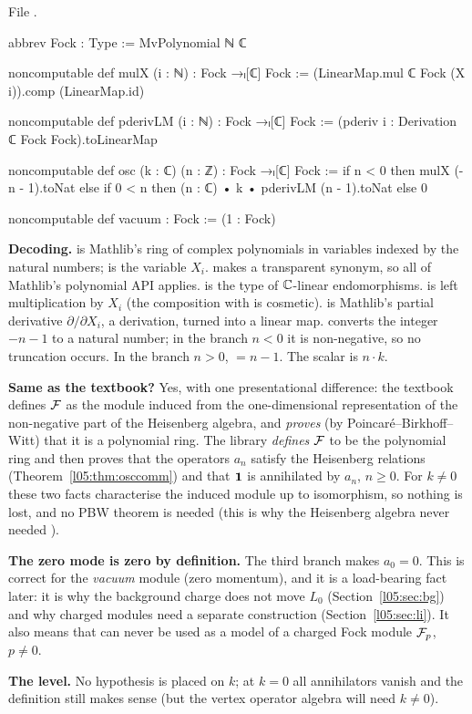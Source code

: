 \noindent File .
\begin{leancode}
abbrev Fock : Type := MvPolynomial ℕ ℂ

noncomputable def mulX (i : ℕ) : Fock →ₗ[ℂ] Fock :=
  (LinearMap.mul ℂ Fock (X i)).comp (LinearMap.id)

noncomputable def pderivLM (i : ℕ) : Fock →ₗ[ℂ] Fock :=
  (pderiv i : Derivation ℂ Fock Fock).toLinearMap

noncomputable def osc (k : ℂ) (n : ℤ) : Fock →ₗ[ℂ] Fock :=
  if n < 0 then mulX (-n - 1).toNat
  else if 0 < n then (n : ℂ) • k • pderivLM (n - 1).toNat
  else 0

noncomputable def vacuum : Fock := (1 : Fock)
\end{leancode}

\begin{dictionary}
\textbf{Decoding.}  is Mathlib's ring of complex polynomials in variables
indexed by the natural numbers;  is the variable $X_i$.  makes  a
transparent synonym, so all of Mathlib's polynomial API applies.  is the type of
${\mathbb{C}}$-linear endomorphisms.  is left multiplication by $X_i$ (the
composition with  is cosmetic).  is Mathlib's partial derivative
$\partial/\partial X_i$, a derivation, turned into a linear map.  converts the
integer $-n-1$ to a natural number; in the branch $n<0$ it is non-negative, so no truncation occurs.
In the branch $n>0$,  $=n-1$. The scalar is $n\cdot k$.

\textbf{Same as the textbook?} Yes, with one presentational difference: the textbook defines $\mathcal{F}$ as
the module induced from the one-dimensional representation of the non-negative part of the
Heisenberg algebra, and \emph{proves} (by Poincar\'e--Birkhoff--Witt) that it is a polynomial ring. The
library \emph{defines} $\mathcal{F}$ to be the polynomial ring and then proves that the operators $a_n$
satisfy the Heisenberg relations (Theorem~\ref{l05:thm:osccomm}) and that $\mathbf{1}$ is annihilated by
$a_n$, $n\ge0$. For $k\neq0$ these two facts characterise the induced module up to isomorphism, so
nothing is lost, and no PBW theorem is needed (this is why the Heisenberg algebra never needed
).

\textbf{The zero mode is zero by definition.} The third branch makes $a_0=0$. This is correct for the
\emph{vacuum} module (zero momentum), and it is a load-bearing fact later: it is why the background
charge does not move $L_0$ (Section~\ref{l05:sec:bg}) and why charged modules need a separate
construction (Section~\ref{l05:sec:li}). It also means that  can never be used as a model of a
charged Fock module $\mathcal{F}_p$, $p\neq0$.

\textbf{The level.} No hypothesis is placed on $k$; at $k=0$ all annihilators vanish and the
definition still makes sense (but the vertex operator algebra will need $k\neq0$).
\end{dictionary}

